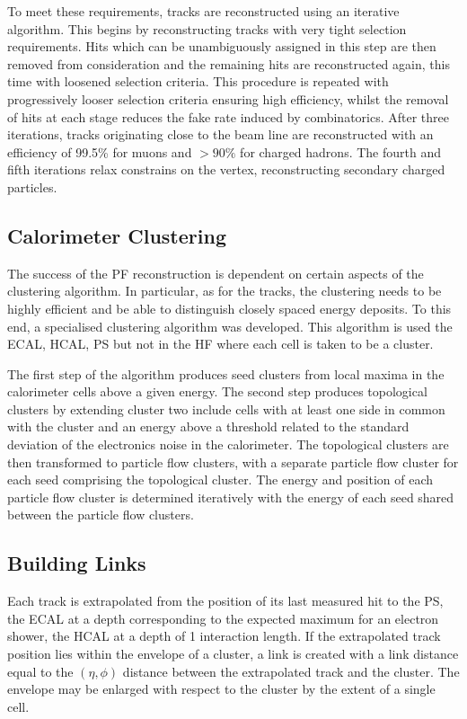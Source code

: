 To meet these requirements, tracks are reconstructed using an iterative
algorithm. This begins by reconstructing tracks with very tight selection
requirements. Hits which can be unambiguously assigned in this step are then
removed from consideration and the remaining hits are reconstructed again, this
time with loosened selection criteria. This procedure is repeated with
progressively looser selection criteria ensuring high efficiency, whilst the
removal of hits at each stage reduces the fake rate induced by combinatorics.
After three iterations, tracks originating close to the beam line are
reconstructed with an efficiency of 99.5\% for muons and $>90\%$ for charged
hadrons. The fourth and fifth iterations relax constrains on the vertex,
reconstructing secondary charged particles.

\subsection{Calorimeter Clustering}
The success of the \ac{PF} reconstruction is dependent on certain aspects of the
clustering algorithm. In particular, as for the tracks, the clustering needs to
be highly efficient and be able to distinguish closely spaced energy deposits.
To this end, a specialised clustering algorithm was developed. This algorithm is
used the \ac{ECAL}, \ac{HCAL}, \ac{PS} but not in the \ac{HF} where each cell is
taken to be a cluster.

The first step of the algorithm produces seed clusters from local maxima in the
calorimeter cells above a given energy. The second step produces topological
clusters by extending cluster two include cells with at least one side in common
with the cluster and an energy above a threshold related to the standard
deviation of the electronics noise in the calorimeter. The topological clusters
are then transformed to particle flow clusters, with a separate particle flow
cluster for each seed comprising the topological cluster. The energy and
position of each particle flow cluster is determined iteratively with the energy
of each seed shared between the particle flow clusters.

\subsection{Building Links}
Each track is extrapolated from the position of its last measured hit to the
\ac{PS}, the \ac{ECAL} at a depth corresponding to the expected maximum for an
electron shower, the \ac{HCAL} at a depth of 1 interaction length. If the
extrapolated track position lies within the envelope of a cluster, a link is
created with a link distance equal to the $(\eta, \phi)$ distance between the
extrapolated track and the cluster. The envelope may be enlarged with respect to
the cluster by the extent of a single cell.

